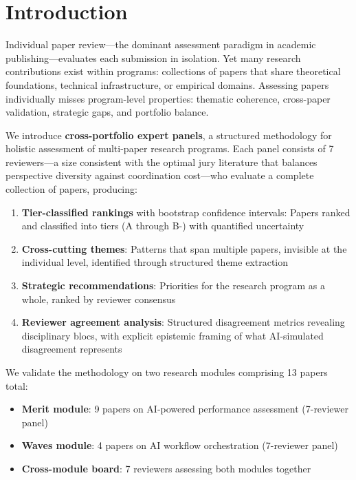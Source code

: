 \section{Introduction}

Individual paper review---the dominant assessment paradigm in academic publishing---evaluates each submission in isolation. Yet many research contributions exist within programs: collections of papers that share theoretical foundations, technical infrastructure, or empirical domains. Assessing papers individually misses program-level properties: thematic coherence, cross-paper validation, strategic gaps, and portfolio balance.

We introduce \textbf{cross-portfolio expert panels}, a structured methodology for holistic assessment of multi-paper research programs. Each panel consists of 7 reviewers---a size consistent with the optimal jury literature \cite{condorcet1785,list2001epistemic} that balances perspective diversity against coordination cost---who evaluate a complete collection of papers, producing:

\begin{enumerate}
    \item \textbf{Tier-classified rankings} with bootstrap confidence intervals: Papers ranked and classified into tiers (A through B-) with quantified uncertainty
    \item \textbf{Cross-cutting themes}: Patterns that span multiple papers, invisible at the individual level, identified through structured theme extraction
    \item \textbf{Strategic recommendations}: Priorities for the research program as a whole, ranked by reviewer consensus
    \item \textbf{Reviewer agreement analysis}: Structured disagreement metrics revealing disciplinary blocs, with explicit epistemic framing of what AI-simulated disagreement represents
\end{enumerate}

We validate the methodology on two research modules comprising 13 papers total:
\begin{itemize}
    \item \textbf{Merit module}: 9 papers on AI-powered performance assessment (7-reviewer panel)
    \item \textbf{Waves module}: 4 papers on AI workflow orchestration (7-reviewer panel)
    \item \textbf{Cross-module board}: 7 reviewers assessing both modules together
\end{itemize}

